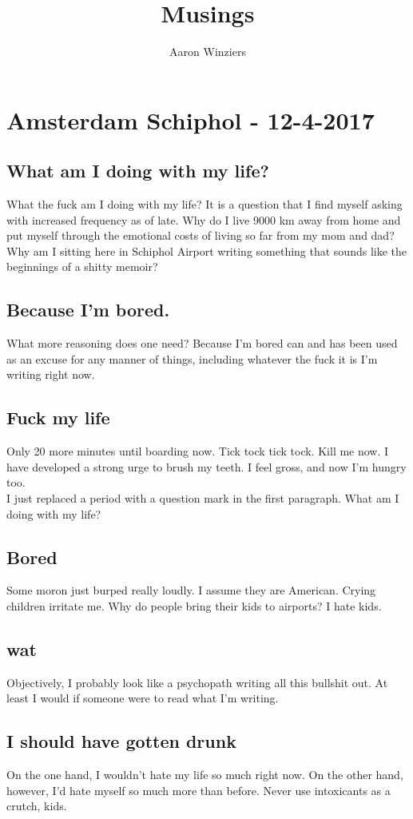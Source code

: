 \documentclass[10pt,a4paper]{book}
\author{Aaron Winziers}
\title{Musings}
\begin{document}
	\maketitle
	\chapter{Amsterdam Schiphol - 12-4-2017}
	\section{What am I doing with my life?}
		What the fuck am I doing with my life? It is a question that I find myself asking with increased frequency as of late. Why do I live 9000 km away from home and put myself through the emotional costs of living so far from my mom and dad? Why am I sitting here in Schiphol Airport writing something that sounds like the beginnings of a shitty memoir?
	\section{Because I'm bored.}
		What more reasoning does one need? Because I'm bored can and has been used as an excuse for any manner of things, including whatever the fuck it is I'm writing right now. 
	\section{Fuck my life}
		Only 20 more minutes until boarding now. Tick tock tick tock. Kill me now. I have developed a strong urge to brush my teeth. I feel gross, and now I'm hungry too.
		\\
		I just replaced a period with a question mark in the first paragraph. What am I doing with my life?
	\section{Bored}
		Some moron just burped really loudly. I assume they are American. Crying children irritate me. Why do people bring their kids to airports? I hate kids.
	\section{wat}
		Objectively, I probably look like a psychopath writing all this bullshit out. At least I would if someone were to read what I'm writing.
	\section{I should have gotten drunk}
		On the one hand, I wouldn't hate my life so much right now. On the other hand, however, I'd hate myself so much more than before. Never use intoxicants as a crutch, kids.
	
		
\end{document}
